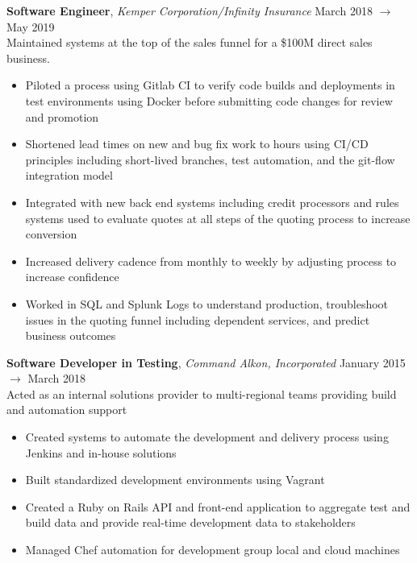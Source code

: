 \documentclass[9pt]{article}
\newenvironment{changemargin}[2]{%
  \begin{list}{}{%
      \setlength{\topsep}{0pt}%
      \setlength{\leftmargin}{#1}%
      \setlength{\rightmargin}{#2}%
      \setlength{\listparindent}{\parindent}%
      \setlength{\itemindent}{\parindent}%
      \setlength{\parsep}{\parskip}%
    }%
  \item[]}{\end{list}
}
\newenvironment{body} {
  \vspace*{-16pt}
  \begin{changemargin}{-0.25in}{-0.5in}
  }	
  {\end{changemargin}
}
\begin{document}
\begin{body}
  \textbf{Software Engineer}, \emph{Kemper Corporation/Infinity Insurance} \hfill March 2018 $\to$ May 2019 \\
  \vspace*{3pt}
  Maintained systems at the top of the sales funnel for a \$100M direct sales business.
  \begin{itemize} \itemsep=-0pt
  \item Piloted a process using Gitlab CI to verify code builds and deployments in test environments using Docker before submitting code changes for review and promotion
  \item Shortened lead times on new and bug fix work to hours using CI/CD principles including short-lived branches, test automation, and the git-flow integration model
  \item Integrated with new back end systems including credit processors and rules systems used to evaluate quotes at all steps of the quoting process to increase conversion
  \item Increased delivery cadence from monthly to weekly by adjusting process to increase confidence
  \item Worked in SQL and Splunk Logs to understand production, troubleshoot issues in the quoting funnel including dependent services, and predict business outcomes
  \end{itemize}
  \vspace{5pt}
  

  \textbf{Software Developer in Testing}, \emph{Command Alkon, Incorporated} \hfill January 2015 $\to$ March 2018 \\
  \vspace*{3pt}
  Acted as an internal solutions provider to multi-regional teams providing build and automation support
  \begin{itemize} \itemsep=-0pt  %
  \item Created systems to automate the development and delivery process using Jenkins and in-house solutions
  \item Built standardized development environments using Vagrant
  \item Created a Ruby on Rails API and front-end application to aggregate test and build data and provide real-time development data to stakeholders
  \item Managed Chef automation for development group local and cloud machines
  \end{itemize}
  \vspace{5pt}

\end{body}
\end{document}
